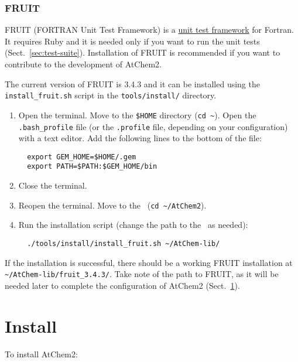 \subsubsection{FRUIT}

FRUIT (FORTRAN Unit Test Framework) is a
\href{https://en.wikipedia.org/wiki/Unit_testing}{unit test framework}
for Fortran. It requires Ruby and it is needed only if you want to run
the unit tests (Sect.~\ref{sec:test-suite}). Installation of FRUIT is
recommended if you want to contribute to the development of AtChem2.

The current version of FRUIT is 3.4.3 and it can be installed using
the \texttt{install\_fruit.sh} script in the \texttt{tools/install/}
directory.

\begin{enumerate}
\item Open the terminal. Move to the \texttt{\$HOME} directory
  (\texttt{cd\ \textasciitilde}). Open the \texttt{.bash\_profile}
  file (or the \texttt{.profile} file, depending on your
  configuration) with a text editor. Add the following lines to the
  bottom of the file:
  \begin{verbatim}
  export GEM_HOME=$HOME/.gem
  export PATH=$PATH:$GEM_HOME/bin
  \end{verbatim}
\item Close the terminal.
\item Reopen the terminal. Move to the \maindir\ (\verb|cd ~/AtChem2|).
\item Run the installation script (change the path to the \depdir\ as
  needed):
  \begin{verbatim}
  ./tools/install/install_fruit.sh ~/AtChem-lib/
  \end{verbatim}
\end{enumerate}

If the installation is successful, there should be a working FRUIT
installation at \texttt{\textasciitilde/AtChem-lib/fruit\_3.4.3/}.
Take note of the path to FRUIT, as it will be needed later to complete
the configuration of AtChem2 (Sect.~\ref{sec:install}).


\section{Install} \label{sec:install}

To install AtChem2:

